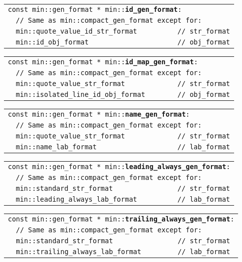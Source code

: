 \documentclass[12pt]{article}
\makeatletter
\newcommand{\TT}[1]{{\tt \bfseries #1}}
\newcommand{\ttindex}[1]{\index{#1@{\tt #1}}}
\newenvironment{indpar}[1][0.3in]%
	{\begin{list}{}%
		     {\setlength{\itemsep}{0in}%
		      \setlength{\topsep}{0in}%
		      \setlength{\parsep}{1ex}%
		      \setlength{\labelwidth}{#1}%
		      \setlength{\leftmargin}{#1}%
		      \addtolength{\leftmargin}{\labelsep}}%
	 \item}%
	{\end{list}}
\newcommand{\LABEL}[1]{\label{#1}}
\newlength{\ARGBREAKLENGTH}
\newcommand{\ARGBREAK}[1][\ARGBREAKLENGTH]{\\&\hspace*{#1}}
\newcommand{\MINKEY}[1]%
	   {\TT{#1}\ttindex{min::#1}\ttindex{#1}}
\makeatother
\begin{document}
\begin{indpar}[1em]\begin{tabular}{r@{}l}
\multicolumn{2}{l}{\tt const min::gen\_format *
                   min::\MINKEY{id\_gen\_format}:}
\LABEL{MIN::ID_GEN_FORMAT}\ARGBREAK
\verb|// Same as min::compact_gen_format except for:|\ARGBREAK
\verb|min::quote_value_id_str_format          // str_format|\ARGBREAK
\verb|min::id_obj_format                      // obj_format|
\end{tabular}\end{indpar}

\begin{indpar}[1em]\begin{tabular}{r@{}l}
\multicolumn{2}{l}{\tt const min::gen\_format *
                   min::\MINKEY{id\_map\_gen\_format}:}
\LABEL{MIN::ID_MAP_GEN_FORMAT}\ARGBREAK
\verb|// Same as min::compact_gen_format except for:|\ARGBREAK
\verb|min::quote_value_str_format             // str_format|\ARGBREAK
\verb|min::isolated_line_id_obj_format        // obj_format|
\end{tabular}\end{indpar}

\begin{indpar}[1em]\begin{tabular}{r@{}l}
\multicolumn{2}{l}{\tt const min::gen\_format *
                   min::\MINKEY{name\_gen\_format}:}
\LABEL{MIN::NAME_GEN_FORMAT}\ARGBREAK
\verb|// Same as min::compact_gen_format except for:|\ARGBREAK
\verb|min::quote_value_str_format             // str_format|\ARGBREAK
\verb|min::name_lab_format                    // lab_format|
\end{tabular}\end{indpar}

\begin{indpar}[1em]\begin{tabular}{r@{}l}
\multicolumn{2}{l}{\tt const min::gen\_format *
                   min::\MINKEY{leading\_always\_gen\_format}:}
\LABEL{MIN::LEADING_ALWAYS_GEN_FORMAT}\ARGBREAK
\verb|// Same as min::compact_gen_format except for:|\ARGBREAK
\verb|min::standard_str_format                // str_format|\ARGBREAK
\verb|min::leading_always_lab_format          // lab_format|
\end{tabular}\end{indpar}

\begin{indpar}[1em]\begin{tabular}{r@{}l}
\multicolumn{2}{l}{\tt const min::gen\_format *
                   min::\MINKEY{trailing\_always\_gen\_format}:}
\LABEL{MIN::TRAILING_ALWAYS_GEN_FORMAT}\ARGBREAK
\verb|// Same as min::compact_gen_format except for:|\ARGBREAK
\verb|min::standard_str_format                // str_format|\ARGBREAK
\verb|min::trailing_always_lab_format         // lab_format|
\end{tabular}\end{indpar}
\end{document}
